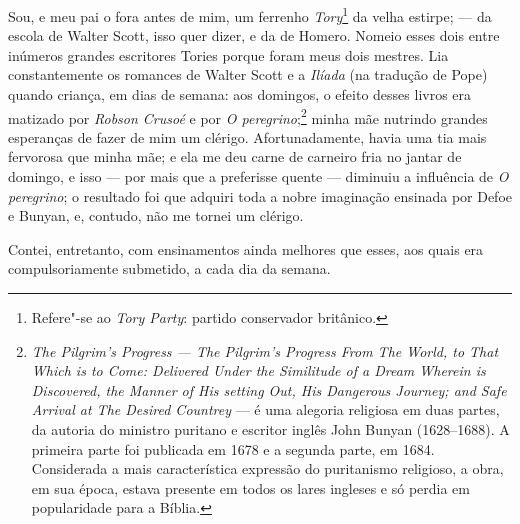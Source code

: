 

 Sou, e meu pai o fora antes de mim, um ferrenho \textit{Tory}\footnote{Refere"-se
  ao \textit{Tory Party}: partido conservador britânico.} da
velha estirpe; --- da escola de Walter Scott, isso quer dizer, e da de
Homero. Nomeio esses dois entre inúmeros grandes escritores Tories
porque foram meus dois mestres. Lia constantemente os romances de Walter
Scott e a \textit{Ilíada} (na tradução de Pope) quando criança, em dias de
semana: aos domingos, o efeito desses livros era matizado por
\textit{Robson Crusoé} e por \textit{O peregrino};\footnote{\textit{The \label{peregrino}
  Pilgrim's Progress --- The Pilgrim's Progress From The World, to That
  Which is to Come: Delivered Under the Similitude of a Dream Wherein is
  Discovered, the Manner of His setting Out, His Dangerous Journey; and
  Safe Arrival at The Desired Countrey} --- é uma alegoria religiosa em
  duas partes, da autoria do ministro puritano e escritor inglês John
  Bunyan (1628--1688). A primeira parte foi publicada em 1678 e a segunda parte, em 1684. Considerada a mais característica expressão do puritanismo religioso,
  a obra, em sua época, estava presente em todos os lares ingleses e só
  perdia em popularidade para a Bíblia.} minha mãe
nutrindo grandes esperanças de fazer de mim um clérigo. Afortunadamente,
havia uma tia mais fervorosa que minha mãe; e ela me deu carne de
carneiro fria no jantar de domingo, e isso --- por mais que a preferisse
quente --- diminuiu a influência de \textit{O peregrino}; o resultado foi
que adquiri toda a nobre imaginação ensinada por Defoe e Bunyan, e,
contudo, não me tornei um clérigo.

Contei, entretanto, com ensinamentos ainda melhores que esses, aos
quais era compulsoriamente submetido, a cada dia da semana.

